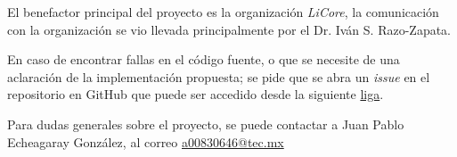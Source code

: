 \documentclass{article}
\begin{document}
        El benefactor principal del proyecto es la organización \textit{LiCore}, la comunicación con la organización se vio llevada principalmente por el Dr. Iván S. Razo-Zapata.

        En caso de encontrar fallas en el código fuente, o que se necesite de una aclaración de la implementación propuesta; se pide que se abra un \textit{issue} en el repositorio en GitHub que puede ser accedido desde la siguiente \href{https://github.com/JuanEcheagaray75/licore-pki}{liga}.

        Para dudas generales sobre el proyecto, se puede contactar a Juan Pablo Echeagaray González, al correo \href{mailto:a00830646@tec.mx}{a00830646@tec.mx}

    \clearpage
    
    
\end{document}
